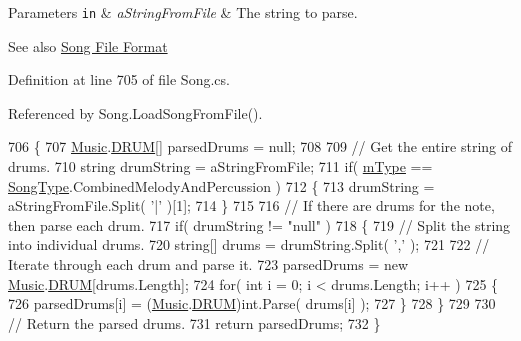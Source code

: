 \begin{DoxyParams}[1]{Parameters}
\mbox{\tt in}  & {\em a\+String\+From\+File} & The string to parse. \\
\hline
\end{DoxyParams}
\begin{DoxySeeAlso}{See also}
\hyperlink{group___song_group_DocSongFileFormat}{Song File Format} 
\end{DoxySeeAlso}


Definition at line 705 of file Song.\+cs.



Referenced by Song.\+Load\+Song\+From\+File().


\begin{DoxyCode}
706     \{
707         \hyperlink{class_music}{Music}.\hyperlink{group___music_enums_gade475b4382c7066d1af13e7c13c029b6}{DRUM}[] parsedDrums = null;
708 
709         \textcolor{comment}{// Get the entire string of drums.}
710         \textcolor{keywordtype}{string} drumString = aStringFromFile;
711         \textcolor{keywordflow}{if}( \hyperlink{group___song_priv_var_gaf3b9d0f461522324f897b746311b43c5}{mType} == \hyperlink{group___song_enums_gae681a1f001333e39fc1cb4fea97bfe1b}{SongType}.CombinedMelodyAndPercussion )
712         \{
713             drumString = aStringFromFile.Split( \textcolor{charliteral}{'|'} )[1];
714         \}
715 
716         \textcolor{comment}{// If there are drums for the note, then parse each drum.}
717         \textcolor{keywordflow}{if}( drumString != \textcolor{stringliteral}{"null"} )
718         \{
719             \textcolor{comment}{// Split the string into individual drums.}
720             \textcolor{keywordtype}{string}[] drums = drumString.Split( \textcolor{charliteral}{','} );
721 
722             \textcolor{comment}{// Iterate through each drum and parse it.}
723             parsedDrums = \textcolor{keyword}{new} \hyperlink{class_music}{Music}.\hyperlink{group___music_enums_gade475b4382c7066d1af13e7c13c029b6}{DRUM}[drums.Length];
724             \textcolor{keywordflow}{for}( \textcolor{keywordtype}{int} i = 0; i < drums.Length; i++ )
725             \{
726                 parsedDrums[i] = (\hyperlink{class_music}{Music}.\hyperlink{group___music_enums_gade475b4382c7066d1af13e7c13c029b6}{DRUM})\textcolor{keywordtype}{int}.Parse( drums[i] );
727             \}
728         \}
729 
730         \textcolor{comment}{// Return the parsed drums.}
731         \textcolor{keywordflow}{return} parsedDrums;
732     \}
\end{DoxyCode}
\mbox{\label{group___song_priv_func_gacf6fee93921e1a5edbc477c0898c357a}} 
